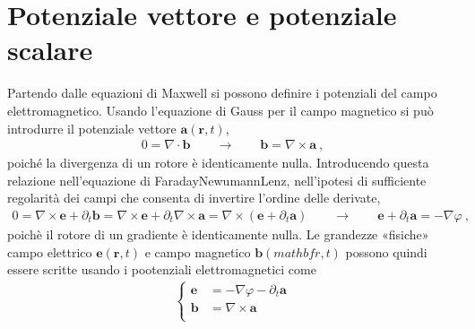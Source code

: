 \documentclass[letterpaper,10pt,italian]{jupyterBook}
\begin{document}
\section{Potenziale vettore e potenziale scalare}
\label{\detokenize{ch/potentials:potenziale-vettore-e-potenziale-scalare}}
\sphinxAtStartPar
Partendo dalle equazioni di Maxwell si possono definire i potenziali del campo elettromagnetico. Usando l’equazione di Gauss per il campo magnetico si può introdurre il potenziale vettore \(\mathbf{a}(\mathbf{r},t)\),
\begin{equation*}
\begin{split}0 = \nabla \cdot \mathbf{b} \qquad \rightarrow \qquad \mathbf{b} = \nabla \times \mathbf{a} \ ,\end{split}
\end{equation*}
\sphinxAtStartPar
poiché la divergenza di un rotore è identicamente nulla. Introducendo questa relazione nell’equazione di Faraday\sphinxhyphen{}Newumann\sphinxhyphen{}Lenz, nell’ipotesi di sufficiente regolarità dei campi che consenta di invertire l’ordine delle derivate,
\begin{equation*}
\begin{split}0 = \nabla \times \mathbf{e} + \partial_t \mathbf{b} = \nabla \times \mathbf{e} +  \partial_t \nabla \times \mathbf{a} = \nabla \times (\mathbf{e} + \partial_t \mathbf{a}) \qquad \rightarrow \qquad \mathbf{e} + \partial_t \mathbf{a} = - \nabla \varphi \ ,\end{split}
\end{equation*}
\sphinxAtStartPar
poichè il rotore di un gradiente è identicamente nulla. Le grandezze «fisiche» campo elettrico \(\mathbf{e}(\mathbf{r},t)\) e campo magnetico \(\mathbf{b}(mathbf{r},t)\) possono quindi essere scritte usando i pootenziali elettromagnetici come
\begin{equation*}
\begin{split}\begin{cases}
 \mathbf{e} & = - \nabla \varphi - \partial_t \mathbf{a} \\
 \mathbf{b} & = \nabla \times \mathbf{a} \\
\end{cases}\end{split}
\end{equation*}
\end{document}
